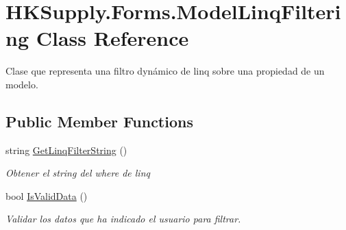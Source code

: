 \hypertarget{class_h_k_supply_1_1_forms_1_1_model_linq_filtering}{}\section{H\+K\+Supply.\+Forms.\+Model\+Linq\+Filtering Class Reference}
\label{class_h_k_supply_1_1_forms_1_1_model_linq_filtering}


Clase que representa una filtro dynámico de linq sobre una propiedad de un modelo.  


\subsection*{Public Member Functions}
\begin{DoxyCompactItemize}
\item 
string \mbox{\hyperlink{class_h_k_supply_1_1_forms_1_1_model_linq_filtering_acae6326ecf09c74070e6d5155c7eb067}{Get\+Linq\+Filter\+String}} ()
\begin{DoxyCompactList}\small\item\em Obtener el string del where de linq \end{DoxyCompactList}\item 
bool \mbox{\hyperlink{class_h_k_supply_1_1_forms_1_1_model_linq_filtering_a66694e21272523c30da7198388f59b0f}{Is\+Valid\+Data}} ()
\begin{DoxyCompactList}\small\item\em Validar los datos que ha indicado el usuario para filtrar. \end{DoxyCompactList}\end{DoxyCompactItemize}
